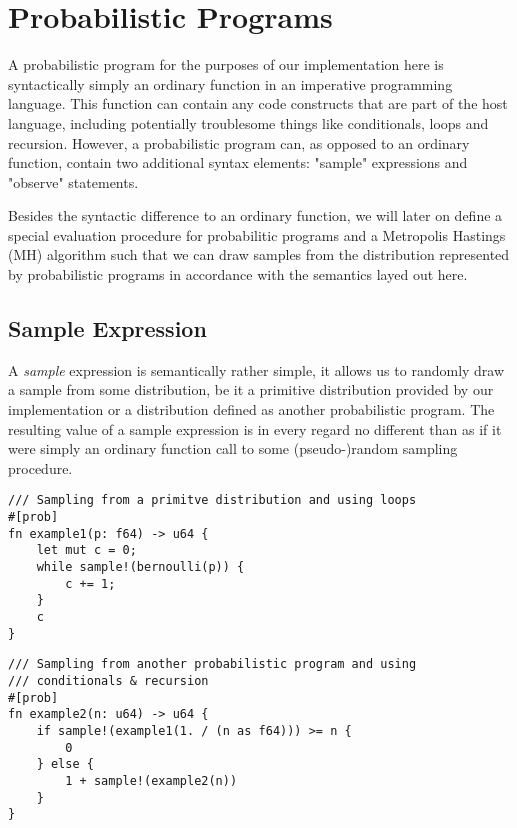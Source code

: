 \section{Probabilistic Programs}

A probabilistic program for the purposes of our implementation here is syntactically simply an ordinary function in an imperative programming language. This function can contain any code constructs that are part of the host language, including potentially troublesome things like conditionals, loops and recursion. However, a probabilistic program can, as opposed to an ordinary function, contain two additional syntax elements: "sample" expressions and "observe" statements.

Besides the syntactic difference to an ordinary function, we will later on define a special evaluation procedure for probabilitic programs and a Metropolis Hastings (MH) algorithm such that we can draw samples from the distribution represented by probabilistic programs in accordance with the semantics layed out here.

\subsection{Sample Expression}

A \textit{sample} expression is semantically rather simple, it allows us to randomly draw a sample from some distribution, be it a primitive distribution provided by our implementation or a distribution defined as another probabilistic program. The resulting value of a sample expression is in every regard no different than as if it were simply an ordinary function call to some (pseudo-)random sampling procedure.

\begin{minipage}{\linewidth}
\begin{lstlisting}
/// Sampling from a primitve distribution and using loops
#[prob]
fn example1(p: f64) -> u64 {
    let mut c = 0;
    while sample!(bernoulli(p)) {
        c += 1;
    }
    c
}
\end{lstlisting}
\end{minipage}

\begin{minipage}{\linewidth}
\begin{lstlisting}
/// Sampling from another probabilistic program and using
/// conditionals & recursion
#[prob]
fn example2(n: u64) -> u64 {
    if sample!(example1(1. / (n as f64))) >= n {
        0
    } else {
        1 + sample!(example2(n))
    }
}
\end{lstlisting}
\end{minipage}


